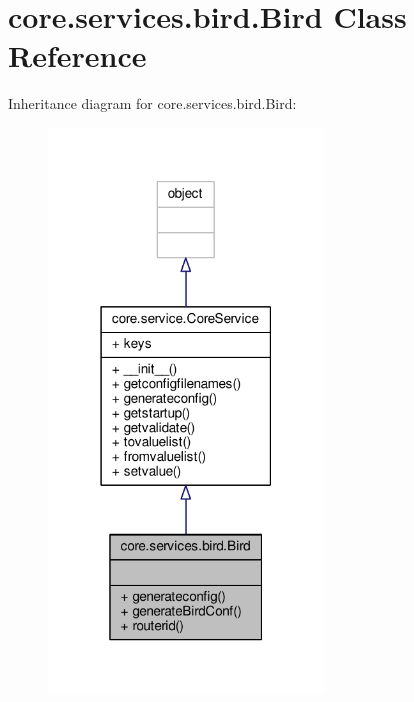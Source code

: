 \hypertarget{classcore_1_1services_1_1bird_1_1_bird}{\section{core.\+services.\+bird.\+Bird Class Reference}
\label{classcore_1_1services_1_1bird_1_1_bird}
}


Inheritance diagram for core.\+services.\+bird.\+Bird\+:
\nopagebreak
\begin{figure}[H]
\begin{center}
\leavevmode
\includegraphics[width=207pt]{classcore_1_1services_1_1bird_1_1_bird__inherit__graph}
\end{center}
\end{figure}


